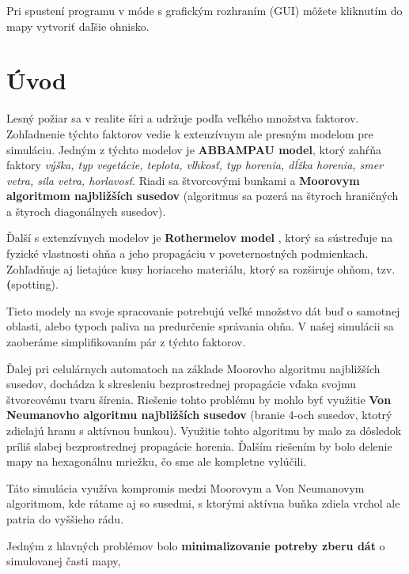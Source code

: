 \documentclass[a4paper,12pt]{article}
\begin{document}
Pri spustení programu v móde s grafickým rozhraním (GUI) môžete kliknutím do mapy vytvoriť daľšie ohnisko.

\section{Úvod}

\par\quad Lesný požiar sa v realite šíri a udržuje podľa veľkého množstva faktorov.
Zohľadnenie týchto faktorov vedie k extenzívnym ale presným modelom pre simuláciu.
Jedným z týchto modelov je \textbf{ABBAMPAU model}\cite{simulations}, ktorý zahŕňa faktory
\textit{výška, typ vegetácie, teplota, vlhkosť, typ horenia, dĺžka horenia,
smer vetra, sila vetra, horlavosť}.
Riadi sa štvorcovými bunkami a \textbf{Moorovym algoritmom najbližších susedov}
(algoritmus sa pozerá na štyroch hraničných a štyroch diagonálnych susedov).
\\
\par Ďalší s extenzívnych modelov je \textbf{Rothermelov model} \cite{fireSpread}, ktorý sa sústreďuje na fyzické vlastnosti ohňa
a jeho propagáciu v poveternostných podmienkach. Zohľadňuje aj lietajúce kusy horiaceho materiálu,
ktorý sa rozširuje ohňom, tzv. \textbf(spotting).
\\
\par Tieto modely na svoje spracovanie potrebujú veľké množstvo dát buď o samotnej oblasti, 
alebo typoch paliva na predurčenie správania ohňa.
V našej simulácii sa zaoberáme simplifikovaním pár z týchto faktorov. 
\\
\par Ďalej pri celulárnych automatoch na základe Moorovho algoritmu najbližších susedov,
dochádza k skresleniu bezprostrednej propagácie vďaka svojmu štvorcovému tvaru šírenia. Riešenie tohto problému by mohlo byť využitie 
\textbf{Von Neumanovho algoritmu najbližších susedov} (branie 4-och susedov, ktotrý zdielajú hranu s aktívnou bunkou). Využitie tohto algoritmu by malo
za dôsledok príliš slabej bezprostrednej propagácie horenia. Ďalším riešením by bolo delenie mapy na hexagonálnu mriežku, čo sme ale kompletne vylúčili.
\\
\par Táto simulácia využíva kompromis medzi Moorovym a Von Neumanovym algoritmom, kde rátame aj so susedmi,
s ktorými aktívna buňka zdiela vrchol ale patria do vyššieho rádu.
\\
\par Jedným z hlavných problémov bolo \textbf{minimalizovanie potreby zberu dát} o simulovanej časti mapy, 
\end{document}
